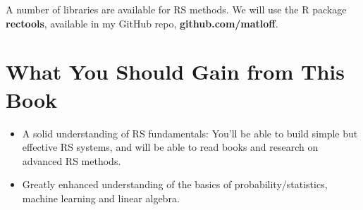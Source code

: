 A number of libraries are available for RS methods.  We will use the R
package \textbf{rectools}, available in my GitHub repo,
\textbf{github.com/matloff}.

\section{What You Should Gain from This Book}

\begin{itemize}

\item A solid understanding of RS fundamentals:  You'll be able to build
simple but effective RS systems, and will be able to read books and
research on advanced RS methods.

\item Greatly enhanced understanding of the basics of
probability/statistics, machine learning and linear algebra.

\end{itemize} 

